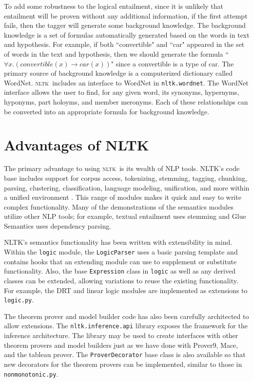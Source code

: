 \documentclass[11pt,a4paper]{article}
\newcommand{\NLTK}{\textsc{nltk}}
\newcommand{\dhgcode}[1]{{\tt #1}}
\begin{document}
To add some robustness to the logical entailment, since it is unlikely that entailment will be proven without any additional information, if the first attempt fails, then the tagger will generate some background knowledge.  The background knowledge is a set of formulas automatically generated based on the words in text and hypothesis.  For example, if both ``convertible" and ``car" appeared in the set of words in the text and hypothesis, then we should generate the formula ``$\forall x.(convertible(x) \rightarrow car(x))$" since a convertible is a type of car.  The primary source of background knowledge is a computerized dictionary called WordNet.  \NLTK\ includes an interface to WordNet in \dhgcode{nltk.wordnet}.  The WordNet interface allows the user to find, for any given word, its synonyms, hypernyms, hyponyms, part holoyms, and member meronyms.  Each of these relationships can be converted into an appropriate formula for background knowledge.


\section{Advantages of NLTK}
The primary advantage to using \NLTK\ is its wealth of NLP tools.  NLTK's code base includes support for corpus access, tokenizing, stemming, tagging, chunking, parsing, clustering, classification, language modeling, unification, and more within a unified environment \cite{Multidisciplinary}.  This range of modules makes it quick and easy to write complex functionality.  Many of the demonstrations of the semantics modules utilize other NLP tools; for example, textual entailment uses stemming and Glue Semantics uses dependency parsing.

NLTK's semantics functionality has been written with extensibility in
mind.  Within the \dhgcode{logic} module, the \dhgcode{LogicParser}
uses a basic parsing template and contains hooks that an extending
module can use to supplement or substitute functionality.  Also, the base \dhgcode{Expression} class in \dhgcode{logic} as well as any derived classes can be extended, allowing variations to reuse the existing functionality.  For example, the DRT and linear logic modules are implemented as extensions to \dhgcode{logic.py}.  

The theorem prover and model builder code has also been carefully architected to allow extensions.  The \dhgcode{nltk.inference.api} library exposes the framework for the inference architecture.  The library may be used to create interfaces with other theorem provers and model builders just as we have done with Prover9, Mace, and the tableau prover.  The \dhgcode{ProverDecorator} base class is also available so that new decorators for the theorem provers can be implemented, similar to those in \dhgcode{nonmonotonic.py}.  
\end{document}
